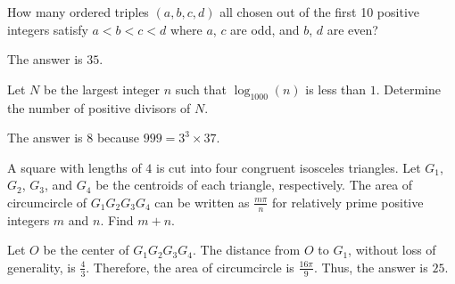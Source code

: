 \begin{problem}
How many ordered triples $(a,b,c,d)$ all chosen out of the first 10 positive integers satisfy $a<b<c<d$ where $a$, $c$ are odd, and $b$, $d$ are even?
\end{problem}

\begin{solution}
The answer is $35$.
\end{solution}

\begin{problem}
Let $N$ be the largest integer $n$ such that $\log_{1000}(n)$ is less than $1$. Determine the number of positive divisors of $N$.
\end{problem}

\begin{solution}
The answer is $8$ because $999=3^3\times37$.
\end{solution}

\begin{problem}
A square with lengths of $4$ is cut into four congruent isosceles triangles. Let $G_1$, $G_2$, $G_3$, and $G_4$ be the centroids of each triangle, respectively. The area of circumcircle of $G_1G_2G_3G_4$ can be written as $\frac{m\pi}{n}$ for relatively prime positive integers $m$ and $n$. Find $m+n$.
\end{problem}

\begin{solution}
Let $O$ be the center of $G_1G_2G_3G_4$. The distance from $O$ to $G_1$, without loss of generality, is $\frac{4}{3}$. Therefore, the area of circumcircle is $\frac{16\pi}{9}$. Thus, the answer is $25$.
\end{solution}